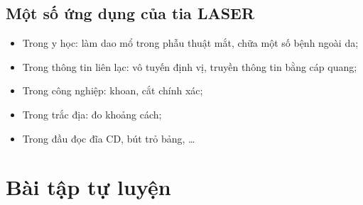 \subsection{Một số ứng dụng của tia LASER}
\begin{itemize}
	\item Trong y học: làm dao mổ trong phẫu thuật mắt, chữa một số bệnh ngoài da;
	\item Trong thông tin liên lạc: vô tuyến định vị, truyền thông tin bằng cáp quang;
	\item Trong công nghiệp: khoan, cắt chính xác;
	\item Trong trắc địa: đo khoảng cách;
	\item Trong đầu đọc đĩa CD, bút trỏ bảng, \ldots
\end{itemize}
\section{Bài tập tự luyện}
